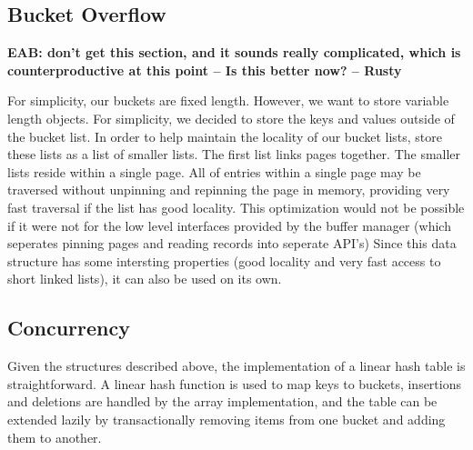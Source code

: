 \documentclass[letterpaper,twocolumn,english]{article}
\newcommand{\yad}{Lemon\xspace}
\newcommand{\eab}[1]{{\bf EAB: #1}}
\begin{document}

\subsection{Bucket Overflow}

\eab{don't get this section, and it sounds really complicated, which is counterproductive at this point  -- Is this better now? -- Rusty}

For simplicity, our buckets are fixed length.  However, we want to
store variable length objects.  For simplicity, we decided to store 
the keys and values outside of the bucket list.
In order to help maintain the locality of our bucket lists, store these lists as a list of smaller lists.  The first list links pages together.  The smaller lists reside within a single page.
All of entries within a single page may be traversed without 
unpinning and repinning the page in memory, providing very fast
traversal if the list has good locality.
This optimization would not be possible if it
were not for the low level interfaces provided by the buffer manager
(which seperates pinning pages and reading records into seperate
API's)  Since this data structure has some intersting 
properties (good locality and very fast access to short linked lists), it can also be used on its own.

\subsection{Concurrency}

Given the structures described above, the implementation of a linear hash
table is straightforward.  A linear hash function is used to map keys
to buckets, insertions and deletions are handled by the array implementation,
and the table can be extended lazily by transactionally removing items
from one bucket and adding them to another.
\end{document}
